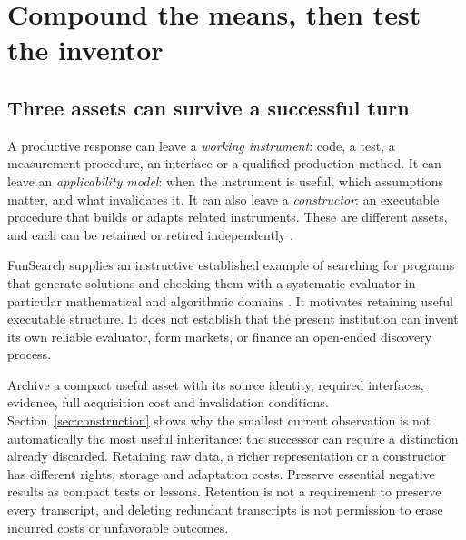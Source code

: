 \section{Compound the means, then test the inventor}
\label{sec:compound}
\subsection{Three assets can survive a successful turn}
A productive response can leave a \emph{working instrument}: code, a test, a measurement procedure, an interface or a qualified production method. It can leave an \emph{applicability model}: when the instrument is useful, which assumptions matter, and what invalidates it. It can also leave a \emph{constructor}: an executable procedure that builds or adapts related instruments. These are different assets, and each can be retained or retired independently \citep[\S3.3]{boucher_genesis}.

FunSearch supplies an instructive established example of searching for programs that generate solutions and checking them with a systematic evaluator in particular mathematical and algorithmic domains \citep{funsearch}. It motivates retaining useful executable structure. It does not establish that the present institution can invent its own reliable evaluator, form markets, or finance an open-ended discovery process.

Archive a compact useful asset with its source identity, required interfaces, evidence, full acquisition cost and invalidation conditions. Section~\ref{sec:construction} shows why the smallest current observation is not automatically the most useful inheritance: the successor can require a distinction already discarded. Retaining raw data, a richer representation or a constructor has different rights, storage and adaptation costs. Preserve essential negative results as compact tests or lessons. Retention is not a requirement to preserve every transcript, and deleting redundant transcripts is not permission to erase incurred costs or unfavorable outcomes.

